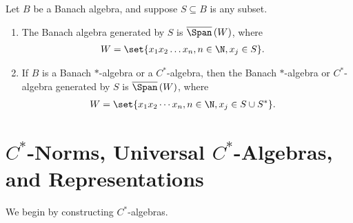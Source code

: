 \begin{lemma}
  Let $B$ be a Banach algebra, and suppose $S\subseteq B$ is any subset.
  \begin{enumerate}[(1)]
    \item The Banach algebra generated by $S$ is $\overline{\Span}\left( W \right)$, where
      \begin{align*}
        W &= \set{x_1x_2\dots x_n,n\in\N,x_j\in S}.
      \end{align*}
    \item If $B$ is a Banach $\ast$-algebra or a $C^{\ast}$-algebra, then the Banach $\ast$-algebra or $C^{\ast}$-algebra generated by $S$ is $\overline{\Span}\left( W \right)$, where
      \begin{align*}
        W &= \set{x_1x_2\cdots x_n, n\in\N,x_j\in S\cup S^{\ast}}.
      \end{align*}
      
  \end{enumerate}
\end{lemma}

\section{\texorpdfstring{$C^{\ast}$-Norms}{C*-Norms}, Universal \texorpdfstring{$C^{\ast}$-Algebras}{C*-Algebras}, and Representations}%
We begin by constructing $C^{\ast}$-algebras.\newline

